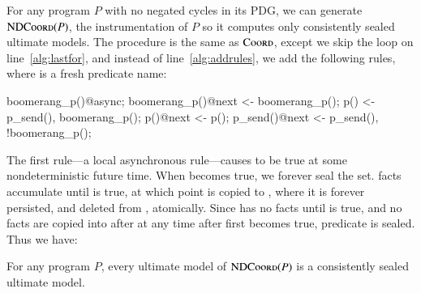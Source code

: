 
For any \lang program $P$ with no negated cycles in its PDG, we can generate $\textsc{NDCoord}(P)$, the instrumentation of $P$ so it computes only consistently sealed ultimate models.  The procedure is the same as $\textsc{Coord}$, except we skip the loop on line~\ref{alg:lastfor}, and instead of line~\ref{alg:addrules}, we add the following rules, where  is a fresh predicate name:

\begin{Dedalus}
boomerang_p()@async;
boomerang_p()@next <- boomerang_p();
p() <- p_send(), boomerang_p();
p()@next <- p();
p_send()@next <- p_send(), !boomerang_p();
\end{Dedalus}

The first rule---a local asynchronous rule---causes  to be true at some nondeterministic future time.  When  becomes true, we forever seal the  set.   facts accumulate until  is true, at which point  is copied to , where it is forever persisted, and deleted from , atomically.  Since  has no  facts until  is true, and no  facts are copied into  after at any time after  first becomes true, predicate  is sealed.  Thus we have:

\begin{theorem}
For any program $P$, every ultimate model of \linebreak $\textsc{NDCoord}(P)$ is a consistently sealed ultimate model.
\end{theorem}

